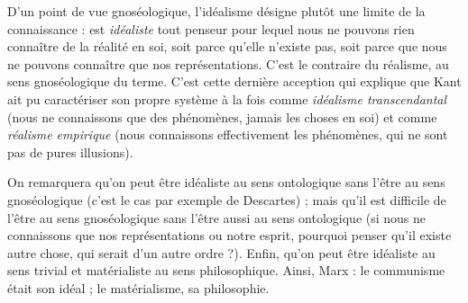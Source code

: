 D'un point de vue gnoséologique, l’idéalisme désigne plutôt une limite de
la connaissance : est {\it idéaliste} tout penseur pour lequel nous ne pouvons rien
connaître de la réalité en soi, soit parce qu’elle n’existe pas, soit parce que nous
ne pouvons connaître que nos représentations. C’est le contraire du réalisme,
au sens gnoséologique du terme. C’est cette dernière acception qui explique
que Kant ait pu caractériser son propre système à la fois comme {\it idéalisme transcendantal}
(nous ne connaissons que des phénomènes, jamais les choses en soi)
et comme {\it réalisme empirique} (nous connaissons effectivement les phénomènes,
qui ne sont pas de pures illusions).

On remarquera qu’on peut être idéaliste au sens ontologique sans l’être au
sens gnoséologique (c’est le cas par exemple de Descartes) ; mais qu’il est difficile
de l’être au sens gnoséologique sans l'être aussi au sens ontologique (si nous
ne connaissons que nos représentations ou notre esprit, pourquoi penser qu'il
existe autre chose, qui serait d’un autre ordre ?). Enfin, qu’on peut être idéaliste
au sens trivial et matérialiste au sens philosophique. Ainsi, Marx : le communisme
était son idéal ; le matérialisme, sa philosophie.

